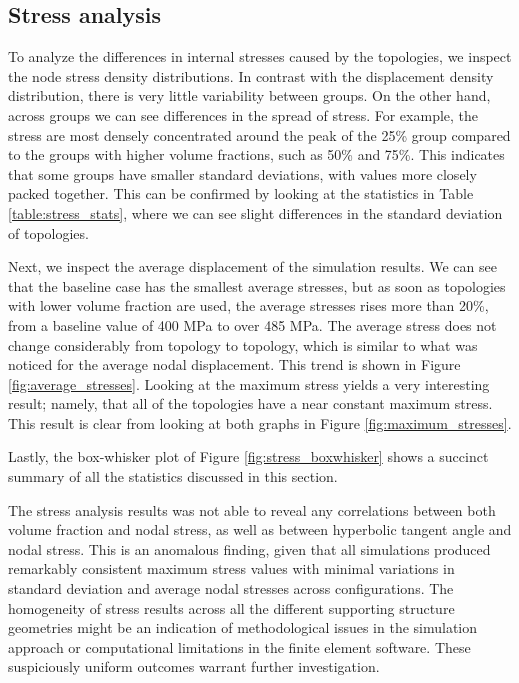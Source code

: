 \documentclass[../main.tex]{subfiles}
\begin{document}
\clearpage
\subsection{Stress analysis}

To analyze the differences in internal stresses caused by the topologies, we inspect the node stress density distributions. In contrast with the displacement density distribution, there is very little variability between groups. On the other hand, across groups we can see differences in the spread of stress. For example, the stress are most densely concentrated around the peak of the 25\% group compared to the groups with higher volume fractions, such as 50\% and 75\%. This indicates that some groups have smaller standard deviations, with values more closely packed together. This can be confirmed by looking at the statistics in  
Table \ref{table:stress_stats}, where we can see slight differences in the standard deviation of topologies.

Next, we inspect the average displacement of the simulation results. We can see that the baseline case has the smallest average stresses, but as soon as topologies with lower volume fraction are used, the average stresses rises more than 20\%, from a baseline value of 400 MPa to over 485 MPa. The average stress does not change considerably from topology to topology, which is similar to what was noticed for the average nodal displacement. This trend is shown in Figure \ref{fig:average_stresses}. Looking at the maximum stress yields a very interesting result; namely, that all of the topologies have a near constant maximum stress. This result is clear from looking at both graphs in Figure \ref{fig:maximum_stresses}.

Lastly, the box-whisker plot of Figure \ref{fig:stress_boxwhisker} shows a succinct summary of all the statistics discussed in this section.

The stress analysis results was not able to reveal any correlations between both volume fraction and nodal stress, as well as between hyperbolic tangent angle and nodal stress. This is an anomalous finding, given that all simulations produced remarkably consistent maximum stress values with minimal variations in standard deviation and average nodal stresses across configurations. The homogeneity of stress results across all the different supporting structure geometries might be an indication of methodological issues in the simulation approach or computational limitations in the finite element software. These suspiciously uniform outcomes warrant further investigation.  
\end{document}

